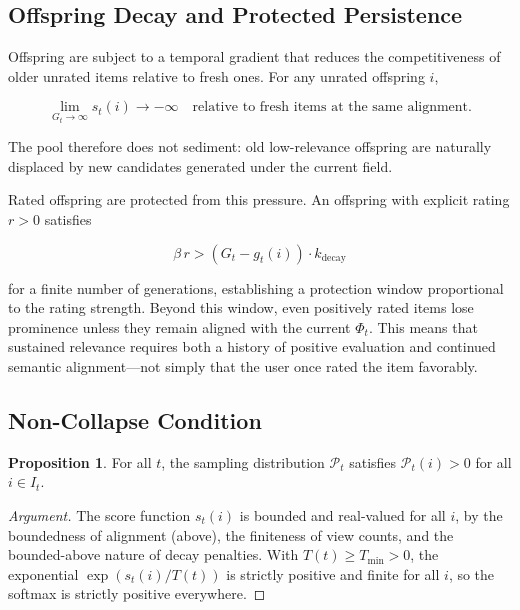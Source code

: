 \documentclass[12pt, a4paper]{article}
\theoremstyle{definition}
\newtheorem{proposition}{Proposition}[section]
\begin{document}
\subsection{Offspring Decay and Protected Persistence}

Offspring are subject to a temporal gradient that reduces the competitiveness of older unrated items relative to fresh ones. For any unrated offspring $i$,

\begin{equation}
\lim_{G_t \to \infty} s_t(i) \to -\infty \quad\text{relative to fresh items at the same alignment.}
\end{equation}

The pool therefore does not sediment: old low-relevance offspring are naturally displaced by new candidates generated under the current field.

Rated offspring are protected from this pressure. An offspring with explicit rating $r > 0$ satisfies

\begin{equation}
\beta\, r > (G_t - g_t(i))\cdot k_{\mathrm{decay}}
\end{equation}

for a finite number of generations, establishing a protection window proportional to the rating strength. Beyond this window, even positively rated items lose prominence unless they remain aligned with the current $\Phi_t$. This means that sustained relevance requires both a history of positive evaluation and continued semantic alignment---not simply that the user once rated the item favorably.

\subsection{Non-Collapse Condition}

\begin{proposition}
For all $t$, the sampling distribution $\mathcal{P}_t$ satisfies $\mathcal{P}_t(i) > 0$ for all $i \in I_t$.
\end{proposition}

\begin{proof}[Argument]
The score function $s_t(i)$ is bounded and real-valued for all $i$, by the boundedness of alignment (above), the finiteness of view counts, and the bounded-above nature of decay penalties. With $T(t) \ge T_{\min} > 0$, the exponential $\exp(s_t(i)/T(t))$ is strictly positive and finite for all $i$, so the softmax is strictly positive everywhere.
\end{proof}
\end{document}
